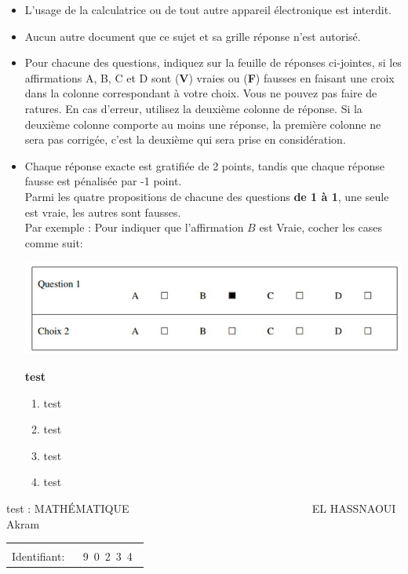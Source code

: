 \documentclass{book}%
\begin{document}
\begin{itemize}%
\item%
L'usage de la calculatrice ou de tout autre appareil électronique est interdit.%
\item%
Aucun autre document que ce sujet et sa grille réponse n'est autorisé.%
\item%
Pour chacune des questions, indiquez sur la feuille de réponses ci-jointes, si les affirmations A, B, C et D sont (\textbf{V}) vraies ou (\textbf{F}) fausses en faisant une croix dans la colonne correspondant à votre choix. Vous ne pouvez pas faire de ratures. En cas d'erreur, utilisez la deuxième colonne de réponse. Si la deuxième colonne comporte au moins une réponse, la première colonne ne sera pas corrigée, c'est la deuxième qui sera prise en considération.%
\item%
Chaque réponse exacte est gratifiée de 2 points, tandis que chaque réponse fausse est pénalisée par -1 point. \\ 	Parmi les quatre propositions de chacune des questions \textbf{de 1 à 1}, une seule est vraie, les autres sont fausses. \\ 	Par exemple : Pour indiquer que l'affirmation $B$ est Vraie, cocher les cases comme suit:  \\ \begin{center}	\includegraphics[scale=0.8]{reponses.png} \end{center}%
\thispagestyle{empty}%
\begin{exercise}%
\textbf{test }%
\begin{enumerate}[label=\textbf{\Alph*. }]%
\item%
test%
\item%
test%
\item%
test%
\item%
test%
\end{enumerate}%
\end{exercise}%
\end{itemize}%
\newpage%
\thispagestyle{empty}%
test : MATHÉMATIQUE $\qquad \qquad \qquad \qquad \qquad \qquad \qquad \qquad$ EL HASSNAOUI Akram%
\begin{flushright}%
\begin{tabular}{|l|}%
\hline%
 \\%
\thispagestyle{empty}%
Identifiant: $\quad$ {\Large 9~0~2~3~4~}%
 \\%
\hline%
\end{tabular}%
\end{flushright}%
\end{document}
